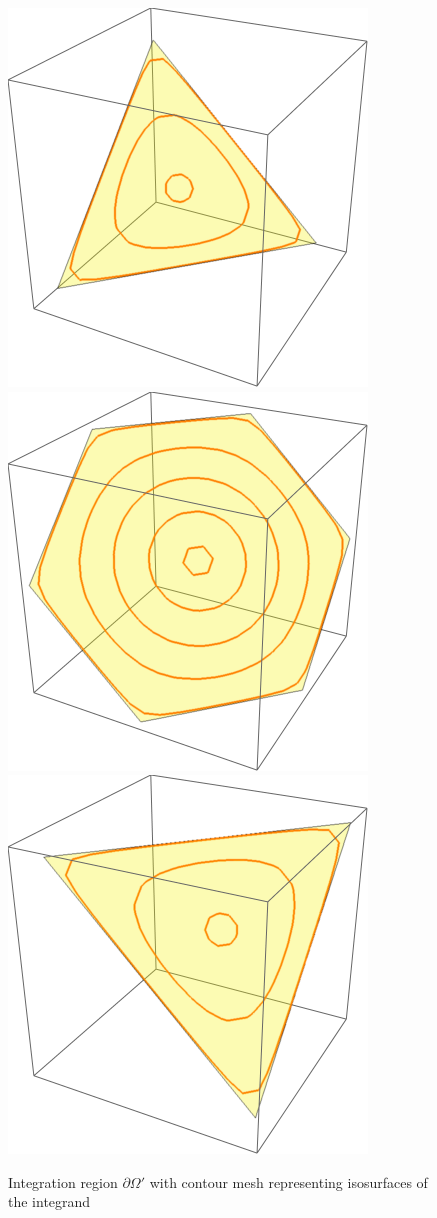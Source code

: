 \documentclass{article}[12pt]
\numberwithin{equation}{section}
\begin{document}
\begin{figure}[H]
\centering{}
\captionsetup{justification=centering}
\includegraphics[scale=0.3]{figures/dos0}
\includegraphics[scale=0.3]{figures/dos1}
\includegraphics[scale=0.3]{figures/dos2}
\caption{Integration region $\partial\Omega'$ with contour mesh
representing isosurfaces of the integrand}
\label{fig:dos}
\end{figure}
\end{document}
